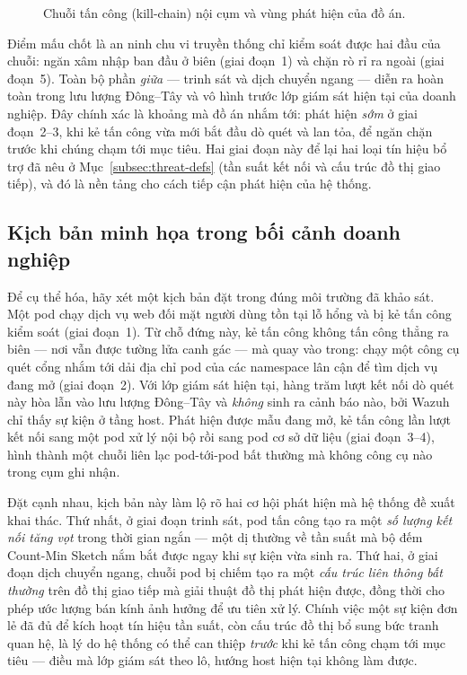 \begin{figure}[H]
  \centering
  \resizebox{0.96\linewidth}{!}{}
  \caption{Chuỗi tấn công (kill-chain) nội cụm và vùng phát hiện của đồ án.}
  \label{fig:kill-chain}
\end{figure}

Điểm mấu chốt là an ninh chu vi truyền thống chỉ kiểm soát được hai đầu của chuỗi: ngăn
xâm nhập ban đầu ở biên (giai đoạn~1) và chặn rò rỉ ra ngoài (giai đoạn~5). Toàn bộ phần
\emph{giữa} --- trinh sát và dịch chuyển ngang --- diễn ra hoàn toàn trong lưu lượng
Đông--Tây và vô hình trước lớp giám sát hiện tại của doanh nghiệp. Đây chính xác là khoảng
mà đồ án nhắm tới: phát hiện \emph{sớm} ở giai đoạn~2--3, khi kẻ tấn công vừa mới bắt đầu
dò quét và lan tỏa, để ngăn chặn trước khi chúng chạm tới mục tiêu. Hai giai đoạn này để
lại hai loại tín hiệu bổ trợ đã nêu ở Mục~\ref{subsec:threat-defs} (tần suất kết nối và
cấu trúc đồ thị giao tiếp), và đó là nền tảng cho cách tiếp cận phát hiện của hệ thống.

\subsection{Kịch bản minh họa trong bối cảnh doanh nghiệp}

Để cụ thể hóa, hãy xét một kịch bản đặt trong đúng môi trường đã khảo sát. Một pod chạy
dịch vụ web đối mặt người dùng tồn tại lỗ hổng và bị kẻ tấn công kiểm soát (giai đoạn~1).
Từ chỗ đứng này, kẻ tấn công không tấn công thẳng ra biên --- nơi vẫn được tường lửa canh
gác --- mà quay vào trong: chạy một công cụ quét cổng nhắm tới dải địa chỉ pod của các
namespace lân cận để tìm dịch vụ đang mở (giai đoạn~2). Với lớp giám sát hiện tại, hàng
trăm lượt kết nối dò quét này hòa lẫn vào lưu lượng Đông--Tây và \emph{không} sinh ra cảnh
báo nào, bởi Wazuh chỉ thấy sự kiện ở tầng host. Phát hiện được mẫu đang mở, kẻ tấn công
lần lượt kết nối sang một pod xử lý nội bộ rồi sang pod cơ sở dữ liệu (giai đoạn~3--4),
hình thành một chuỗi liên lạc pod-tới-pod bất thường mà không công cụ nào trong cụm ghi
nhận.

Đặt cạnh nhau, kịch bản này làm lộ rõ hai cơ hội phát hiện mà hệ thống đề xuất khai thác.
Thứ nhất, ở giai đoạn trinh sát, pod tấn công tạo ra một \emph{số lượng kết nối tăng vọt}
trong thời gian ngắn --- một dị thường về tần suất mà bộ đếm Count-Min Sketch nắm bắt được
ngay khi sự kiện vừa sinh ra. Thứ hai, ở giai đoạn dịch chuyển ngang, chuỗi pod bị chiếm
tạo ra một \emph{cấu trúc liên thông bất thường} trên đồ thị giao tiếp mà giải thuật đồ thị
phát hiện được, đồng thời cho phép ước lượng bán kính ảnh hưởng để ưu tiên xử lý. Chính
việc một sự kiện đơn lẻ đã đủ để kích hoạt tín hiệu tần suất, còn cấu trúc đồ thị bổ sung
bức tranh quan hệ, là lý do hệ thống có thể can thiệp \emph{trước} khi kẻ tấn công chạm
tới mục tiêu --- điều mà lớp giám sát theo lô, hướng host hiện tại không làm được.

